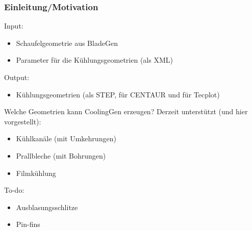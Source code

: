 \documentclass[8pt, aspectratio=169]{beamer}
\begin{document}
\begin{frame}
	\frametitle{Einleitung/Motivation}
	\vspace{-1cm}\hspace{-0.5cm}
	\begin{minipage}[t]{\textwidth}
		Input:
		\begin{itemize}
			\item Schaufelgeometrie aus BladeGen
			\item Parameter für die Kühlungsgeometrien (als XML)
		\end{itemize}
		Output:
		\begin{itemize}
			\item Kühlungsgeometrien (als STEP, für CENTAUR und für Tecplot)
		\end{itemize}

		Welche Geometrien kann CoolingGen erzeugen?
		Derzeit unterstützt (und hier vorgestellt):
		\begin{itemize}
			\item Kühlkanäle (mit Umkehrungen)
			\item Prallbleche (mit Bohrungen)
			\item Filmkühlung
		\end{itemize}

		To-do:
		\begin{itemize}
			\item Ausblasungsschlitze
			\item Pin-fins
		\end{itemize}
	\end{minipage}
	\vfill
\end{frame}
\end{document}
